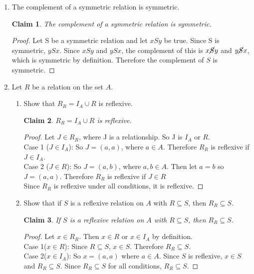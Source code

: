 \documentclass[11pt]{letter}
\newtheorem{claim}{Claim}
\theoremstyle{definition}
\begin{document}
\begin{description}
\begin{enumerate}
                        
		\item The complement of a symmetric relation is symmetric.
                  \begin{claim}
                    The complement of a symmetric relation is symmetric.
                  \end{claim}
                  
                  \begin{proof}
                    Let S be a symmetric relation and let $xSy$ be true. Since S is symmetric, $ySx$. Since $xSy$ and $ySx$, the complement of this is $x\cancel{S} y$ and $y\cancel{S} x$, which is symmetric by definition. Therefore the complement of $S$ is symmetric.
                  \end{proof}
                  
		\item Let $R$ be a relation on the set $A$.
			\begin{enumerate}
			\item Show that $R_R=I_A\cup R$ is reflexive.
                          \begin{claim}
                            $R_R=I_A\cup R$ is reflexive.
                          \end{claim}
                          \begin{proof}
                            Let $J \in R_R$, where J is a relationship. So J is $I_A$ or $R$. \\
                            Case 1 ($J\in I_A$): So $J=(a,a)$, where $a\in A$. Therefore $R_R$ is reflexive if $J\in I_A$.\\
                            Case 2 ($J\in R$): So $J=(a,b)$, where $a,b\in A$. Then let $a=b$ so $J=(a,a)$. Therefore $R_R$ is reflexive if $J\in R$\\
                            Since $R_R$ is reflexive under all conditions, it is reflexive.
                          \end{proof}
                          
			\item Show that if $S$ is a reflexive relation on $A$ with $R\subseteq S$, then $R_R\subseteq S$.
                          \begin{claim}
                            If $S$ is a reflexive relation on $A$ with $R\subseteq S$, then $R_R\subseteq S$.
                          \end{claim}
                          \begin{proof}
                            Let $x\in R_R$. Then $x\in R$ or $x\in I_A$ by definition.\\
                            Case 1($x\in R$): Since $R \subseteq S$, $x\in S$. Therefore $R_R\subseteq S$.\\
                            Case 2($x\in I_A$): So $x=(a,a)$ where $a\in A$. Since $S$ is reflexive, $x\in S$ and $R_R\subseteq S$.
                            Since $R_R\subseteq S$ for all conditions, $R_R\subseteq S$.
                          \end{proof}
                          

\end{enumerate}
\end{enumerate}
\end{description}
\end{document}

